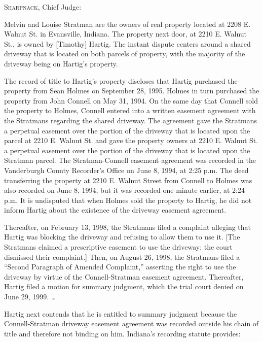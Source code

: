 
\textsc{Sharpnack}, Chief Judge:

Melvin and Louise Stratman are the owners of real property located at 2208 E.
Walnut St. in Evansville, Indiana. The property next door, at 2210 E. Walnut
St., is owned by [Timothy] Hartig. The instant dispute centers around a shared
driveway that is located on both parcels of property, with the majority of the
driveway being on Hartig's property.

The record of title to Hartig's property discloses that Hartig purchased the
property from Sean Holmes on September 28, 1995. Holmes in turn purchased the
property from John Connell on May 31, 1994. On the same day that Connell sold
the property to Holmes, Connell entered into a written easement agreement with
the Stratmans regarding the shared driveway. The agreement gave the Stratmans a
perpetual easement over the portion of the driveway that is located upon the
parcel at 2210 E. Walnut St. and gave the property owners at 2210 E. Walnut St.
a perpetual easement over the portion of the driveway that is located upon the
Stratman parcel. The Stratman-Connell easement agreement was recorded in the
Vanderburgh County Recorder's Office on June 8, 1994, at 2:25 p.m. The deed
transferring the property at 2210 E. Walnut Street from Connell to Holmes was
also recorded on June 8, 1994, but it was recorded one minute earlier, at 2:24
p.m. It is undisputed that when Holmes sold the property to Hartig, he did not
inform Hartig about the existence of the driveway easement agreement.

Thereafter, on February 13, 1998, the Stratmans filed a complaint alleging that
Hartig was blocking the driveway and refusing to allow them to use it. [The
Stratmans claimed a prescriptive easement to use the driveway; the court
dismissed their complaint.] Then, on August 26, 1998, the Stratmans filed a
``Second Paragraph of Amended Complaint,'' asserting the right to use the
driveway by virtue of the Connell-Stratman easement agreement. Thereafter,
Hartig filed a motion for summary judgment, which the trial court denied on
June 29, 1999. \dots{} 


Hartig next contends that he is entitled to summary judgment because the
Connell-Stratman driveway easement agreement was recorded outside his chain of
title and therefore not binding on him. Indiana's recording statute provides: 

